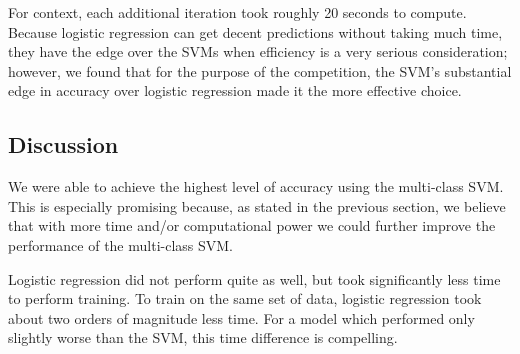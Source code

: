 \documentclass{sigchi}
\begin{document}
For context, each additional iteration took roughly 20 seconds to compute. Because logistic regression can get decent predictions without taking much time, they have the edge over the SVMs when efficiency is a very serious consideration; however, we found that for the purpose of the competition, the SVM's substantial edge in accuracy over logistic regression made it the more effective choice.

\subsection{Discussion}

We were able to achieve the highest level of accuracy using the multi-class SVM. This is especially promising because, as stated in the previous section, we believe that with more time and/or computational power we could further improve the performance of the multi-class SVM.

Logistic regression did not perform quite as well, but took significantly less time to perform training. To train on the same set of data, logistic regression took about two orders of magnitude less time. For a model which performed only slightly worse than the SVM, this time difference is compelling.
\end{document}

